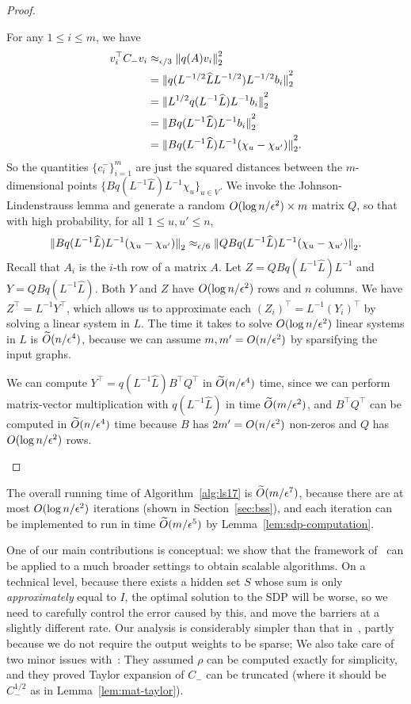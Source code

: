 \begin{proof}
\begin{enumerate}
For any $1 \le i \le m$, we have
\begin{align*}
v_i^\top C_- v_i
& \approx_{\epsilon/3} {\lVert q(A) v_i{\rVert}}_2^2 \\
& = {\lVert q(L^{-1/2} \widehat L L^{-1/2}) L^{-1/2} b_i{\rVert}}_2^2 \\
& = {\lVert L^{1/2} q(L^{-1} \widehat L) L^{-1} b_i{\rVert}}_2^2 \\
& = {\lVert B q(L^{-1} \widehat L) L^{-1} b_i{\rVert}}_2^2 \\
& = {\lVert B q(L^{-1} \widehat L) L^{-1} (\chi_u - \chi_{u'}){\rVert}}_2^2.
\end{align*}
So the quantities $\{c^-_i\}_{i=1}^m$ are just the squared distances between the $m$-dimensional points $\{B q(L^{-1} \hat L) L^{-1} \chi_u\}_{u\in V}$.
We invoke the Johnson-Lindenstrauss lemma and generate a random $O(\log n/\epsilon^2) \times m$ matrix $Q$, so that with high probability, for all $1 \le u, u' \le n$,
\[
{\lVert Bq(L^{-1} \widehat L)L^{-1}(\chi_u - \chi_{u'}){\rVert}}_2 \approx_{\epsilon/6} {\lVert QBq(L^{-1} \widehat L)L^{-1}(\chi_u - \chi_{u'}){\rVert}}_2.
\]
Recall that $A_i$ is the $i$-th row of a matrix $A$.
Let $Z = QBq(L^{-1} \hat L)L^{-1}$ and $Y = QBq(L^{-1} \hat L)$.
Both $Y$ and $Z$ have $O(\log n/\epsilon^2)$ rows and $n$ columns.
We have $Z^\top = L^{-1} Y^\top$, which allows us to approximate each $(Z_i)^\top = L^{-1} (Y_i)^\top$ by solving a linear system in $L$.
The time it takes to solve $O(\log n/\epsilon^2)$ linear systems in $L$ is $\widetilde O(n/\epsilon^4)$, because we can assume $m, m' = O(n/\epsilon^2)$ by sparsifying the input graphs.

We can compute $Y^\top = q(L^{-1} \hat L) B^\top Q^\top$ in $\widetilde O(n/\epsilon^4)$ time, since we can perform matrix-vector multiplication with $q(L^{-1} \hat L)$ in time $\widetilde O(m/\epsilon^2)$, and $B^\top Q^\top$ can be computed in $\widetilde O(n/\epsilon^4)$ time because $B$ has $2m' = O(n/\epsilon^2)$ non-zeros and $Q$ has $O(\log n/\epsilon^2)$ rows. \jmlrQED %
\end{enumerate}
\renewcommand{\jmlrQED}{}
\end{proof}

The overall running time of Algorithm~\ref{alg:ls17} is $\widetilde O(m / \epsilon^7)$, because there are at most $O(\log n / \epsilon^2)$ iterations (shown in Section~\ref{sec:bss}), and each iteration can be implemented to run in time $\widetilde O(m / \epsilon^{5})$ by Lemma~\ref{lem:sdp-computation}.

One of our main contributions is conceptual: we show that the framework of~\cite{BatsonSS12} can be applied to a much broader settings to obtain scalable algorithms.
On a technical level, because there exists a hidden set $S$ whose sum is only \emph{approximately} equal to $I$, the optimal solution to the SDP will be worse, so we need to carefully control the error caused by this, and move the barriers at a slightly different rate.
Our analysis is considerably simpler than that in~\citep{LeeS17}, partly because we do not require the output weights to be sparse;
We also take care of two minor issues with~\citep{LeeS17}: They assumed $\rho$ can be computed exactly for simplicity, and they proved Taylor expansion of $C_-$ can be truncated (where it should be $C_-^{1/2}$ as in Lemma~\ref{lem:mat-taylor}).


